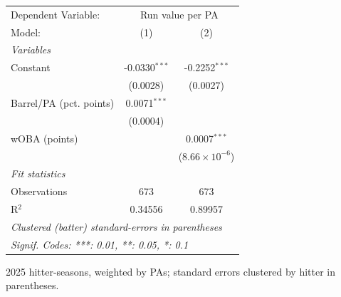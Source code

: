 
\begingroup
\centering
\begin{tabular}{lcc}
   \tabularnewline \midrule \midrule
   Dependent Variable: & \multicolumn{2}{c}{Run value per PA}\\
   Model:                  & (1)             & (2)\\  
   \midrule
   \emph{Variables}\\
   Constant                & -0.0330$^{***}$ & -0.2252$^{***}$\\   
                           & (0.0028)        & (0.0027)\\   
   Barrel/PA (pct. points) & 0.0071$^{***}$  &   \\   
                           & (0.0004)        &   \\   
   wOBA (points)           &                 & 0.0007$^{***}$\\   
                           &                 & ($8.66\times 10^{-6}$)\\    
   \midrule
   \emph{Fit statistics}\\
   Observations            & 673             & 673\\  
   R$^2$                   & 0.34556         & 0.89957\\  
   \midrule \midrule
   \multicolumn{3}{l}{\emph{Clustered (batter) standard-errors in parentheses}}\\
   \multicolumn{3}{l}{\emph{Signif. Codes: ***: 0.01, **: 0.05, *: 0.1}}\\
\end{tabular}
 
\par \raggedright 
2025 hitter-seasons, weighted by PAs; standard errors clustered by hitter in parentheses.
\par\endgroup


